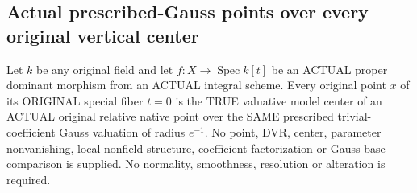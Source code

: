 \subsection{Actual prescribed-Gauss points over every original vertical center}

\begin{theorem}
\label{berkovich:original-vertical-point-prescribed-gauss-center}
\leanok
{}
Let $k$ be any original field and let $f:X\to\operatorname{Spec}k[t]$ be an
ACTUAL proper dominant morphism from an ACTUAL integral scheme. Every original
point $x$ of its ORIGINAL special fiber $t=0$ is the TRUE valuative model
center of an ACTUAL original relative native point over the SAME prescribed
trivial-coefficient Gauss valuation of radius $e^{-1}$.
No point, DVR, center, parameter nonvanishing, local nonfield structure,
coefficient-factorization or Gauss-base comparison is supplied. No normality,
smoothness, resolution or alteration is required.
\end{theorem}
